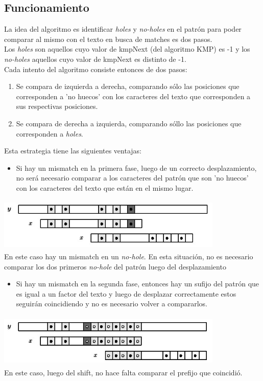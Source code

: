 \documentclass[a4paper, 10pt]{article}
\newcommand\tab[1][0.5cm]{\hspace*{#1}}
\begin{document}
		\subsection{Funcionamiento}    		
    			La idea del algoritmo es identificar \emph{holes} y \emph{no-holes} en el patrón para poder comparar al mismo con el texto
    			en busca de matches es dos pasos. \\
    			\tab Los \emph{holes} son aquellos cuyo valor de kmpNext (del algoritmo KMP) es -1 y los \emph{no-holes} aquellos cuyo 
    			valor de kmpNext es distinto de -1. \\
    			\tab Cada intento del algoritmo consiste entonces de dos pasos:
    			\begin{enumerate}
    				\item Se compara de izquierda a derecha, comparando sólo las posiciones que corresponden a 'no huecos' con los
        			caracteres del texto que corresponden a sus respectivas posiciones.
        			\item Se compara de derecha a izquierda, comparando sóllo las posiciones que corresponden a \emph{holes}.
    			\end{enumerate}
			\tab Esta estrategia tiene las siguientes ventajas:
			\begin{itemize}
				\item Si hay un mismatch en la primera fase, luego de un correcto desplazamiento, no será necesario comparar a 
        			los caracteres del patrón que son 'no huecos' con los caracteres del texto que están en el mismo lugar.
        		\end{itemize}
        		\begin{center}
        			\includegraphics[width=4.25in, height=1in]{images/nohole}
        			\\ En este caso hay un mismatch en un \emph{no-hole}. En esta situación, no es necesario comparar los dos primeros
			    \emph{no-hole} del patrón luego del desplazamiento
		    \end{center}
        		\begin{itemize}
        			\item Si hay un mismatch en la segunda fase, entonces hay un sufijo del patrón que es igual a un factor del texto
        			y luego de desplazar correctamente estos seguirán coincidiendo y no es necesario volver a compararlos.
			\end{itemize}
			\begin{center}
        			\includegraphics[width=4.25in, height=1in]{images/hole}
				\\En este caso, luego del shift, no hace falta comparar el prefijo que coincidió.
		    \end{center}
\end{document}
